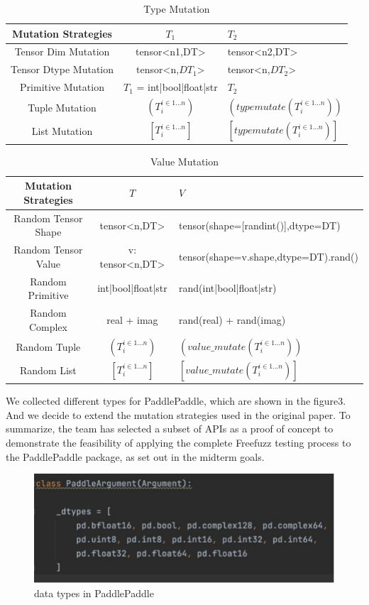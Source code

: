 \documentclass[sigconf]{acmart}
\begin{document}
  \begin{table}[h]
    \centering
    \caption{Type Mutation}
    \label{tab:freq}
    \begin{tabular}{ccl}
      \toprule
      Mutation Strategies&$T_1$&$T_2$\\
      \midrule
      Tensor Dim Mutation & tensor<n1,DT>& tensor<n2,DT>\\
      Tensor Dtype Mutation & tensor<n,$DT_1$>& tensor<n,$DT_2$>\\
      Primitive Mutation & $T_1$ = int|bool|float|str & $T_2$\\
      Tuple Mutation & $(T_i ^ {i\in 1...n})$&$(typemutate(T_i ^ {i\in 1...n}))$ \\
      List Mutation & $[T_i ^ {i\in 1...n}]$&$[typemutate(T_i ^ {i\in 1...n})]$ \\
    \bottomrule
  \end{tabular}
  \end{table}

  \begin{table}[h]
    \centering
    \caption{Value Mutation}
    \label{tab:freq}
    \begin{tabular}{ccl}
      \toprule
      Mutation Strategies&$T$&$V$\\
      \midrule
      Random Tensor Shape& tensor<n,DT>& tensor(shape=[randint()],dtype=DT)\\
      Random Tensor Value& v: tensor<n,DT>& tensor(shape=v.shape,dtype=DT).rand()\\
      Random Primitive& int|bool|float|str & rand(int|bool|float|str)\\
      Random Complex& real + imag & rand(real) + rand(imag)\\
      Random Tuple& $(T_i ^ {i\in 1...n})$&$(value\_mutate(T_i ^ {i\in 1...n}))$ \\
      Random List& $[T_i ^ {i\in 1...n}]$&$[value\_mutate(T_i ^ {i\in 1...n})]$ \\
    \bottomrule
  \end{tabular}
  \end{table}


  We collected different types for PaddlePaddle, which are shown in the figure3. 
  And we decide to extend the mutation strategies used in the original paper.
  To summarize, the team has selected a subset of APIs as a proof of concept to 
  demonstrate the feasibility of applying the complete Freefuzz testing process to the PaddlePaddle package, 
  as set out in the midterm goals.
  \begin{figure}[h]
    \centering
    \includegraphics[width=\linewidth]{4.png}
    \caption{data types in PaddlePaddle}
  \end{figure}
\end{document}
